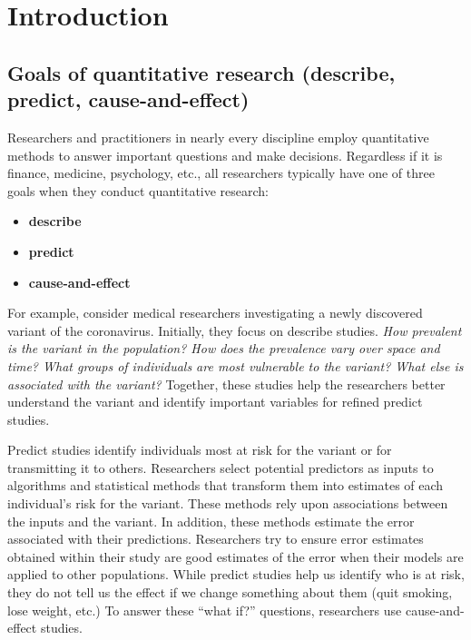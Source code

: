 \documentclass[
]{book}
\begin{document}
\hypertarget{introduction}{%
\chapter{Introduction}\label{introduction}}

\hypertarget{goals-of-quantitative-research-describe-predict-cause-and-effect}{%
\section{Goals of quantitative research (describe, predict, cause-and-effect)}\label{goals-of-quantitative-research-describe-predict-cause-and-effect}}

Researchers and practitioners in nearly every discipline employ quantitative methods to answer important questions and make decisions. Regardless if it is finance, medicine, psychology, etc., all researchers typically have one of three goals \citep{cozby2020methods} when they conduct quantitative research:

\begin{itemize}
\item
  \textbf{describe}
\item
  \textbf{predict}
\item
  \textbf{cause-and-effect}
\end{itemize}

For example, consider medical researchers investigating a newly discovered variant of the coronavirus. Initially, they focus on describe studies. \emph{How prevalent is the variant in the population? How does the prevalence vary over space and time? What groups of individuals are most vulnerable to the variant? What else is associated with the variant?} Together, these studies help the researchers better understand the variant and identify important variables for refined predict studies.

Predict studies identify individuals most at risk for the variant or for transmitting it to others. Researchers select potential predictors as inputs to algorithms and statistical methods that transform them into estimates of each individual's risk for the variant. These methods rely upon associations between the inputs and the variant. In addition, these methods estimate the error associated with their predictions. Researchers try to ensure error estimates obtained within their study are good estimates of the error when their models are applied to other populations. While predict studies help us identify who is at risk, they do not tell us the effect if we change something about them (quit smoking, lose weight, etc.) To answer these ``what if?'' questions, researchers use cause-and-effect studies.
\end{document}
